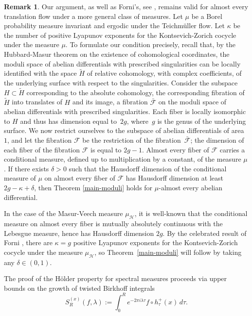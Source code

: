 \documentclass[11pt]{article}
\numberwithin{equation}{section}\newcommand{\Relation}[2][]{}\newtheorem*{prop*}{Proposition}
\let\mathcal\mathscr
\theoremstyle{plain}
\theoremstyle{definition}
\newtheorem{remark}[theorem]{Remark}
\let\lam\lambda
\newcommand{\Fk}{\mathcal{F}}
\newcommand{\HH}{\mathcal{H}}
\begin{document}
\begin{remark} \label{remark-main}
Our argument, as well as Forni's, see \cite[Rem.\,1.9]{Forni2}, remains valid for almost every translation flow under a more general class of measures. Let $\mu$ be a Borel probability measure invariant and ergodic under the Teichmüller flow.
Let $\kappa$ be the number of positive Lyapunov exponents for the Kontsevich-Zorich cocycle under the measure $\mu$.
To formulate our condition precisely, recall that, by the Hubbard-Masur theorem on the existence of cohomological coordinates, the moduli space of abelian differentials with prescribed singularities can be locally identified with the space
${\widetilde H}$ of relative cohomology, with complex coefficients, of the underlying surface with respect to the singularities. Consider the subspace $H\subset {\widetilde H}$ corresponding to the absolute cohomology, the corresponding fibration of ${\widetilde H}$ into translates of $H$ and its image, a fibration $\bar{\Fk}$ on the moduli space of abelian differentials with prescribed singularities. Each fiber is locally isomorphic to $H$ and thus has dimension equal to~$2g$, where~$g$ is the genus of the underlying surface. We now restrict ourselves to the subspace of abelian differentials of area $1$, and let the fibration $\Fk$ be the restriction of the fibration~$\bar{\Fk}$; the dimension of each fiber of the fibration $\Fk$ is equal to $2g-1$. Almost every fiber of $\Fk$ carries a conditional measure, defined up to multiplication by a constant, of the measure $\mu$. If there exists
$\delta>0$ such that the Hausdorff dimension of the conditional measure of $\mu$ on almost every fiber of $\Fk$ has Hausdorff dimension at least $2g-\kappa+\delta$, then Theorem \ref{main-moduli} holds for $\mu$-almost every abelian differential.

In the case of the Masur-Veech measure $\mu_\HH$, it is well-known that the conditional measure on almost every fiber is mutually absolutely continuous with the Lebesgue measure, hence has Hausdorff dimension $2g$. By the celebrated result of Forni \cite{Forni}, there are $\kappa=g$ positive Lyapunov exponents for the Kontsevich-Zorich cocycle under the measure $\mu_\HH$, so
Theorem~\ref{main-moduli} will follow by taking any $\delta\in (0,1)$.
\end{remark}

The proof of the Hölder property for spectral measures proceeds via upper bounds on the growth of twisted Birkhoff integrals
\[
S_R^{(x)}(f,\lam) := \int_0^R e^{-2\pi i \lam \tau} f\circ h^+_\tau(x)\,d\tau.
\]
\end{document}
